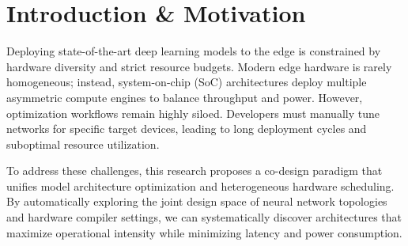 \section{Introduction \& Motivation}
Deploying state-of-the-art deep learning models to the edge is constrained by hardware diversity and strict resource budgets. Modern edge hardware is rarely homogeneous; instead, system-on-chip (SoC) architectures deploy multiple asymmetric compute engines to balance throughput and power. However, optimization workflows remain highly siloed. Developers must manually tune networks for specific target devices, leading to long deployment cycles and suboptimal resource utilization. 

To address these challenges, this research proposes a co-design paradigm that unifies model architecture optimization and heterogeneous hardware scheduling. By automatically exploring the joint design space of neural network topologies and hardware compiler settings, we can systematically discover architectures that maximize operational intensity while minimizing latency and power consumption.
